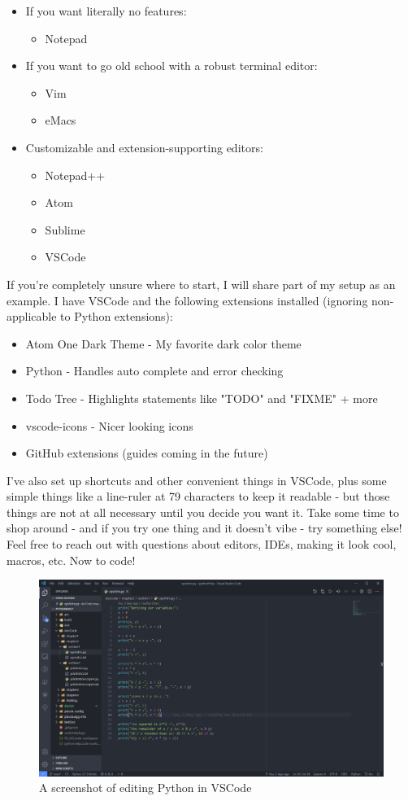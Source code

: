 \documentclass[oneside]{book}
\begin{document}
\begin{itemize}
\item If you want literally no features:
\begin{itemize}
\item Notepad
\end{itemize}
\item If you want to go old school with a robust terminal editor:
\begin{itemize}
\item Vim
\item eMacs
\end{itemize}
\item Customizable and extension-supporting editors:
\begin{itemize}
\item Notepad++
\item Atom
\item Sublime
\item VSCode
\end{itemize}
\end{itemize}

If you're completely unsure where to start, I will share part of my setup as an example. I have VSCode and the following extensions installed (ignoring non-applicable to Python extensions):

\begin{itemize}
\item Atom One Dark Theme - My favorite dark color theme
\item Python - Handles auto complete and error checking
\item Todo Tree - Highlights statements like "TODO" and "FIXME" + more
\item vscode-icons - Nicer looking icons
\item GitHub extensions (guides coming in the future)
\end{itemize}

I've also set up shortcuts and other convenient things in VSCode, plus some simple things like a line-ruler at 79 characters to keep it readable - but those things are not at all necessary until you decide you want it. Take some time to shop around - and if you try one thing and it doesn't vibe - try something else! Feel free to reach out with questions about editors, IDEs, making it look cool, macros, etc. Now to code!

\begin{figure}[H]
\centering
\includegraphics[width=0.8\linewidth]{./img/vscodeExample.PNG}
\caption{A screenshot of editing Python in VSCode}
\label{fig:vscode}
\end{figure}
\end{document}
